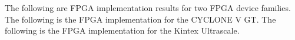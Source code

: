 \label{sec:ir}
\ifnum{}
\ifnum{}
The following are FPGA implementation results for two FPGA device families.
\fi
\ifnum{}
The following is the FPGA implementation for the CYCLONE V GT.
\fi
\fi
\ifnum{}
\ifnum{}
The following is the FPGA implementation for the Kintex Ultrascale.
\fi
\fi


